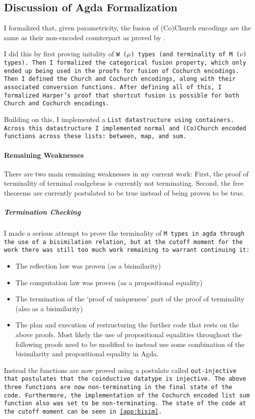 
\subsection{Discussion of Agda Formalization}\label{sec:agda_form_disc}
I formalized that, given parametricity, the fusion of (Co)Church encodings are the same as their non-encoded counterpart as proved by \cite{Harper2011}.

I did this by first proving initality of \tt{W} ($\mu$) types (and terminality of \tt{M} ($\nu$) types).
Then I formalized the categorical fusion property, which only ended up being used in the proofs for fusion of Cochurch encodings.
Then I defined the Church and Cochurch encodings, along with their associated conversion functions.
After defining all of this, I formalized Harper's proof that shortcut fusion is possible for both Church and Cochurch encodings.

Building on this, I implemented a \tt{List} datastructure using containers.
Across this datastructure I implemented normal and (Co)Church encoded functions across these lists: \tt{between}, \tt{map}, and \tt{sum}.

\paragraph{Remaining Weaknesses}
There are two main remaining weaknesses in my current work:
First, the proof of terminality of terminal coalgebras is currently not terminating.
Second, the free theorems are currently postulated to be true instead of being proven to be true.

\subparagraph{Termination Checking}
I made a serious attempt to prove the terminality of \tt{M} types in agda through the use of a bisimilation relation, but at the cutoff moment for the work there was still too much work remaining to warrant continuing it:
\begin{itemize}[noitemsep]
  \item The reflection law was proven (as a bisimilarity)
  \item The computation law was proven (as a propositional equality)
  \item The termination of the `proof of uniqueness' part of the proof of terminality (also as a bisimilarity)
  \item The plan and execution of restructuring the further code that rests on the above proofs.
  Most likely the use of propositional equalities throughout the following proofs need to be modified to instead use some combination of the bisimilarity and propositional equality in Agda.
\end{itemize}
Instead the functions are now proved using a postulate called \tt{out-injective} that postulates that the coinductive datatype is injective.
The above three functions are now non-terminating in the final state of the code.
Furthermore, the implementation of the Cochurch encoded list \tt{sum} function also was set to be non-terminating.
The state of the code at the cutoff moment can be seen in \autoref{app:bisim}.


